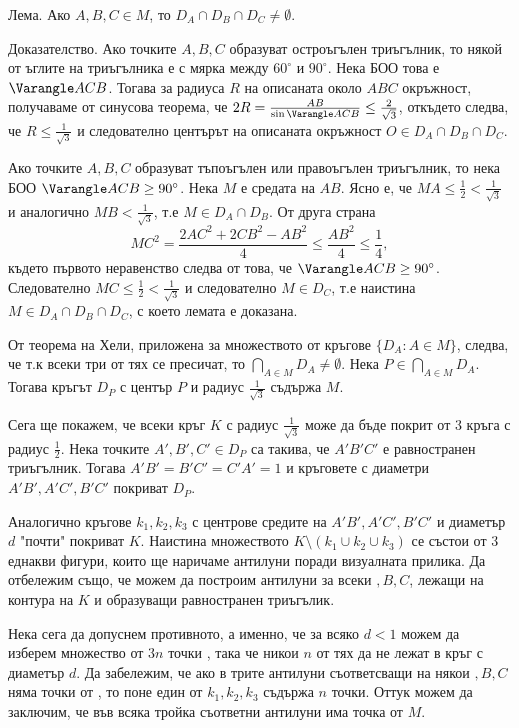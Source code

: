 Лема. Ако $A,B,C\in M$, то $D_A\cap D_B\cap D_C\ne\emptyset$.

Доказателство. Ако точките $A,B,C$ образуват остроъгълен триъгълник, то някой от ъглите на триъгълника е с мярка между $60^\circ$ и $90^\circ$. Нека БОО това е $\Varangle ACB$. Тогава за радиуса $R$ на описаната около $ABC$ окръжност, получаваме от синусова теорема, че $2R=\frac{AB}{\sin\Varangle ACB}\leq\frac2{\sqrt3}$, откъдето следва, че $R\leq\frac1{\sqrt3}$ и следователно центърът на описаната окръжност $O\in D_A\cap D_B\cap D_C$.

Ако точките $A,B,C$ образуват тъпоъгълен или правоъгълен триъгълник, то нека БОО $\Varangle ACB\geq90^\circ$. Нека $M$ е средата на $AB$. Ясно е, че $MA\leq\frac12<\frac1{\sqrt3}$ и аналогично $MB<\frac1{\sqrt3}$, т.е $M\in D_A\cap D_B$. От друга страна
$$
MC^2=\frac{2AC^2+2CB^2-AB^2}{4}\leq\frac{AB^2}{4}\leq\frac14,
$$
където първото неравенство следва от това, че $\Varangle ACB\geq90^\circ$. Следователно $MC\leq\frac12<\frac1{\sqrt3}$ и следователно $M\in D_C$, т.е наистина $M\in D_A\cap D_B\cap D_C$, с което лемата е доказана.

От теорема на Хели, приложена за множеството от кръгове $\{D_A:A\in M\}$, следва, че т.к всеки три от тях се пресичат, то $\bigcap_{A\in M}D_A\ne\emptyset$. Нека $P\in\bigcap_{A\in M}D_A$. Тогава кръгът $D_P$ с център $P$ и радиус $\frac1{\sqrt3}$ съдържа $M$.

Сега ще покажем, че всеки кръг $K$ с радиус $\frac1{\sqrt3}$ може да бъде покрит от 3 кръга с радиус $\frac12$. Нека точките $A',B',C'\in D_P$ са такива, че $A'B'C'$ е равностранен триъгълник. Тогава $A'B'=B'C'=C'A'=1$ и кръговете с диаметри $A'B',A'C',B'C'$ покриват $D_P$.

Аналогично кръгове $k_1,k_2,k_3$ с центрове средите на $A'B',A'C',B'C'$ и диаметър $d$ "почти" покриват $K$. Наистина множеството $K\setminus(k_1\cup k_2\cup k_3)$ се състои от 3 еднакви фигури, които ще наричаме антилуни поради визуалната прилика. Да отбележим също, че можем да построим антилуни за всеки $,B,C$, лежащи на контура на $K$ и образуващи равностранен триъгълик.

Нека сега да допуснем противното, а именно, че за всяко $d<1$ можем да изберем множество от $3n$ точки , така че никои $n$ от тях да не лежат в кръг с диаметър $d$. Да забележим, че ако в трите антилуни съответсващи на някои $,B,C$ няма точки от , то поне един от $k_1,k_2,k_3$ съдържа $n$ точки. Оттук можем да заключим, че във всяка тройка съответни антилуни има точка от $M$.

